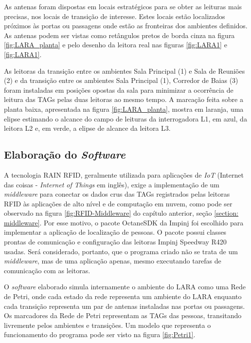 As antenas foram dispostas em locais estratégicos para se obter as leituras mais precisas, nos locais de transição de interesse. Estes locais estão localizados próximos às portas ou passagens onde estão as fronteiras dos ambientes definidos. As antenas podem ser vistas como retângulos pretos de borda cinza na figura \ref{fig:LARA_planta} e pelo desenho da leitora real nas figuras \ref{fig:LARA1} e \ref{fig:LARA1}.

As leitoras da transição entre os ambientes Sala Principal (1) e Sala de Reuniões (2) e da transição entre os ambientes Sala Principal (1), Corredor de Baias (3) foram instaladas em posições opostas da sala para minimizar a ocorrência de leitura das TAGs pelas duas leitoras ao mesmo tempo. A marcação feita sobre a planta baixa, apresentada na figura \ref{fig:LARA_planta}, mostra em laranja, uma elipse estimando o alcance do campo de leituras da interrogadora L1, em azul, da leitora L2 e, em verde, a elipse de alcance da leitora L3. 

 \subsection{Elaboração do \textit{Software}} \label{section:software}
 
 A tecnologia RAIN RFID, geralmente utilizada para aplicações de \textit{IoT} (Internet das coisas - \textit{Internet of Things} em inglês), exige a implementação de um \textit{middleware} para conectar os dados crus das TAGs registrados pelas leitoras RFID às aplicações de alto nível e de computação em nuvem, como pode ser observado na figura \ref{fig:RFID-Middleware} do capítulo anterior, seção \ref{section: middleware}. Por esse motivo, o pacote OctaneSDK da Impinj foi escolhido para implementar a aplicação de localização de pessoas. O pacote possui classes prontas de comunicação e configuração das leitoras Impinj Speedway R420 usadas. Será considerado, portanto, que o programa criado não se trata de um \textit{middleware}, mas de uma aplicação apenas, mesmo executando tarefas de comunicação com as leitoras.
 
 O \textit{software} elaborado simula internamente o ambiente do LARA como uma Rede de Petri, onde cada estado da rede representa um ambiente do LARA enquanto cada transição representa um par de antenas instaladas nas portas ou passagens. Os marcadores da Rede de Petri representam as TAGs das pessoas, transitando livremente pelos ambientes e transições. Um modelo que representa o funcionamento do programa pode ser visto na figura \ref{fig:Petri1}.
 
